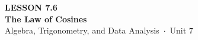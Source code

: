 \documentclass[aspectratio=169, 11pt]{beamer}
\begin{document}
{
\begin{frame}[plain]
  \vspace{2.8cm}\hspace{0.55cm}%
  \begin{minipage}{0.9\textwidth}
    {\color{goldacc}\bfseries\small LESSON 7.6}\\[0.5cm]
    {\color{white}\bfseries\LARGE The Law of Cosines}\\[1.2cm]
    {\color{mistmid}\small Algebra, Trigonometry, and Data Analysis~$\cdot$~Unit 7}
  \end{minipage}
\end{frame}
}

\begin{frame}[t, plain]
\end{frame}
\end{document}
